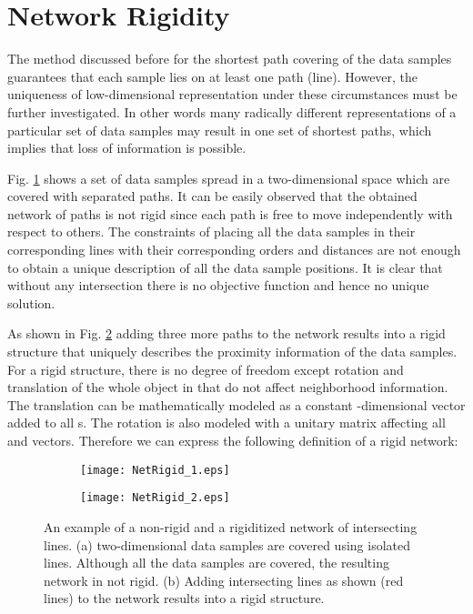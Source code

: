 \documentclass[10pt,journal,cspaper,compsoc]{IEEEtran}
\let\MYoriglatexcaption\caption
\renewcommand{\caption}[2][\relax]{\MYoriglatexcaption[#2]{#2}}
\begin{document}
\appendices
\section{Network Rigidity}
The method discussed before for the shortest path covering of the data samples guarantees that each sample lies on at least one path (line). However, the uniqueness of low-dimensional representation under these circumstances must be further investigated. In other words many radically different representations of a particular set of data samples may result in one set of shortest paths, which implies that loss of information is possible. 

Fig. \ref{fig_6_1_a} shows a set of  data samples spread in a two-dimensional space which are covered with  separated paths. It can be easily observed that the obtained network of paths is not rigid since each path is free to move independently with respect to others. The constraints of placing all the data samples in their corresponding lines with their corresponding orders and distances are not enough to obtain a unique description of all the data sample positions. It is clear that without any intersection there is no objective function and hence no unique solution.

As shown in Fig. \ref{fig_6_1_b} adding three more paths to the network results into a rigid structure that uniquely describes the proximity information of the data samples. For a rigid structure, there is no degree of freedom except rotation and translation of the whole object in  that do not affect neighborhood information. The translation can be mathematically modeled as a constant -dimensional vector added to all s. The rotation is also modeled with a  unitary matrix affecting all  and  vectors. Therefore we can express the following definition of a rigid network:

\begin{figure}[t]
\centering
        \begin{subfigure}[b]{0.22\textwidth}
                \texttt{[image: NetRigid\_1.eps]}
                \caption{}
                \label{fig_6_1_a}
        \end{subfigure}\begin{subfigure}[b]{0.22\textwidth}
                \texttt{[image: NetRigid\_2.eps]}
                \caption{}
                \label{fig_6_1_b}
        \end{subfigure}
        \caption{{\small An example of a non-rigid and a rigiditized network of intersecting lines. (a)  two-dimensional data samples are covered using  isolated lines. Although all the data samples are covered, the resulting network in not rigid. (b) Adding  intersecting lines as shown (red lines) to the network results into a rigid structure.}}
 \label{fig_6_1}
\end{figure}
\end{document}
